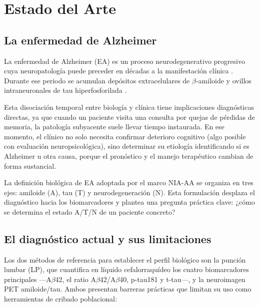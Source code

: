 \chapter{Estado del Arte}\label{chap:estado_arte}

\section{La enfermedad de Alzheimer}

La enfermedad de Alzheimer (EA) es un proceso neurodegenerativo progresivo cuya neuropatología puede preceder en décadas a la manifestación clínica \parencite{holtzman2011alzheimers}. Durante ese periodo se acumulan depósitos extracelulares de $\beta$-amiloide y ovillos intraneuronales de tau hiperfosforilada \parencite{querfurth2010alzheimers,drummond2017alzheimers}.

Esta disociación temporal entre biología y clínica tiene implicaciones diagnósticas directas, ya que cuando un paciente visita una consulta por quejas de pérdidas de memoria, la patología subyacente suele llevar tiempo instaurada. En ese momento, el clínico no solo necesita confirmar deterioro cognitivo (algo posible con evaluación neuropsicológica), sino determinar su etiología identificando si es Alzheimer u otra causa, porque el pronóstico y el manejo terapéutico cambian de forma sustancial.

La definición biológica de EA adoptada por el marco NIA-AA \parencite{jack2018nia} se organiza en tres ejes: amiloide (A), tau (T) y neurodegeneración (N). Esta formulación desplaza el diagnóstico hacia los biomarcadores y plantea una pregunta práctica clave: ¿cómo se determina el estado A/T/N de un paciente concreto?

\section{El diagnóstico actual y sus limitaciones}

Los dos métodos de referencia para establecer el perfil biológico son la punción lumbar (LP), que cuantifica en líquido cefalorraquídeo los cuatro biomarcadores principales ---A$\beta$42, el ratio A$\beta$42/A$\beta$40, p-tau181 y t-tau---, y la neuroimagen PET amiloide/tau. Ambos presentan barreras prácticas que limitan su uso como herramientas de cribado poblacional:

